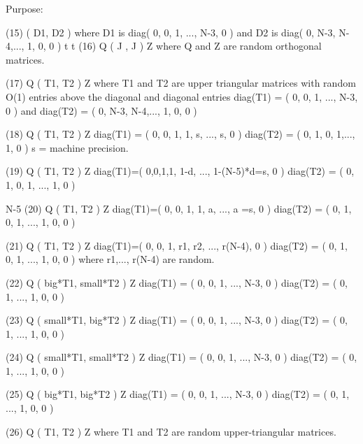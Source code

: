 \begin{DoxyParagraph}{Purpose\+: }
\begin{DoxyVerb}
 (15) ( D1, D2 )        where D1 is diag( 0, 0, 1, ..., N-3, 0 ) and
                        D2 is diag( 0, N-3, N-4,..., 1, 0, 0 )
           t   t
 (16) Q ( J , J ) Z     where Q and Z are random orthogonal matrices.

 (17) Q ( T1, T2 ) Z    where T1 and T2 are upper triangular matrices
                        with random O(1) entries above the diagonal
                        and diagonal entries diag(T1) =
                        ( 0, 0, 1, ..., N-3, 0 ) and diag(T2) =
                        ( 0, N-3, N-4,..., 1, 0, 0 )

 (18) Q ( T1, T2 ) Z    diag(T1) = ( 0, 0, 1, 1, s, ..., s, 0 )
                        diag(T2) = ( 0, 1, 0, 1,..., 1, 0 )
                        s = machine precision.

 (19) Q ( T1, T2 ) Z    diag(T1)=( 0,0,1,1, 1-d, ..., 1-(N-5)*d=s, 0 )
                        diag(T2) = ( 0, 1, 0, 1, ..., 1, 0 )

                                                        N-5
 (20) Q ( T1, T2 ) Z    diag(T1)=( 0, 0, 1, 1, a, ..., a   =s, 0 )
                        diag(T2) = ( 0, 1, 0, 1, ..., 1, 0, 0 )

 (21) Q ( T1, T2 ) Z    diag(T1)=( 0, 0, 1, r1, r2, ..., r(N-4), 0 )
                        diag(T2) = ( 0, 1, 0, 1, ..., 1, 0, 0 )
                        where r1,..., r(N-4) are random.

 (22) Q ( big*T1, small*T2 ) Z    diag(T1) = ( 0, 0, 1, ..., N-3, 0 )
                                  diag(T2) = ( 0, 1, ..., 1, 0, 0 )

 (23) Q ( small*T1, big*T2 ) Z    diag(T1) = ( 0, 0, 1, ..., N-3, 0 )
                                  diag(T2) = ( 0, 1, ..., 1, 0, 0 )

 (24) Q ( small*T1, small*T2 ) Z  diag(T1) = ( 0, 0, 1, ..., N-3, 0 )
                                  diag(T2) = ( 0, 1, ..., 1, 0, 0 )

 (25) Q ( big*T1, big*T2 ) Z      diag(T1) = ( 0, 0, 1, ..., N-3, 0 )
                                  diag(T2) = ( 0, 1, ..., 1, 0, 0 )

 (26) Q ( T1, T2 ) Z     where T1 and T2 are random upper-triangular
                         matrices.\end{DoxyVerb}
 
\end{DoxyParagraph}

